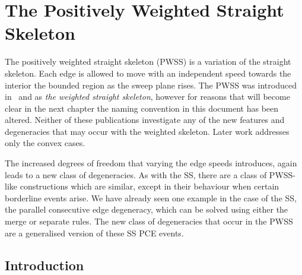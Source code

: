 \FloatBarrier
\section{The Positively Weighted Straight Skeleton}
\label{s:pwss}



The positively weighted straight skeleton (PWSS) is a variation of the straight skeleton. Each edge is allowed to move with an independent speed towards the interior the bounded region as the sweep plane rises. The PWSS was introduced in~\cite{Aichholzer:1996:SKF} and \cite{Epp:98} as \emph{the weighted straight skeleton}, however for reasons that will become clear in the next chapter the naming convention in this document has been altered. Neither of these publications investigate any of the new features and degeneracies that may occur with the weighted skeleton. Later work\cite{Aurenhammer:2008:WSA} addresses only the convex cases.


The increased degrees of freedom that varying the edge speeds introduces, again leads to a new class of degeneracies. As with the SS, there are a class of PWSS-like constructions which are similar, except in their behaviour when certain borderline events arise. We have already seen one example in the case of the SS, the parallel consecutive edge degeneracy, which can be solved using either the merge or separate rules. The new class of degeneracies that occur in the PWSS are a generalised version of these SS PCE events.

\subsection {Introduction}

